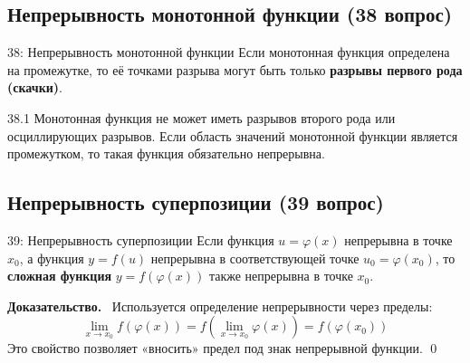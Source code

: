 \documentclass[a4paper,12pt]{article}
\newcommand{\myproof}{\textbf{Доказательство.}\ }
\begin{document}
	\vspace{1cm}
	\subsection{Непрерывность монотонной функции (38 вопрос)}
	
	\begin{theorembox}{38: Непрерывность монотонной функции}
		Если монотонная функция определена на промежутке, то её точками разрыва могут быть только \textbf{разрывы первого рода (скачки)}.
	\end{theorembox}
	
	\begin{remarkbox}{38.1}
		Монотонная функция не может иметь разрывов второго рода или осциллирующих разрывов. Если область значений монотонной функции является промежутком, то такая функция обязательно непрерывна.
	\end{remarkbox}
	
	
	
	
	\newpage
	\subsection{Непрерывность суперпозиции (39 вопрос)}
	
	\begin{theorembox}{39: Непрерывность суперпозиции}
		Если функция $u = \varphi(x)$ непрерывна в точке $x_0$, а функция $y = f(u)$ непрерывна в соответствующей точке $u_0 = \varphi(x_0)$, то \textbf{сложная функция} $y = f(\varphi(x))$ также непрерывна в точке $x_0$.
	\end{theorembox}
	
	\myproof
	Используется определение непрерывности через пределы:
	\[ \lim_{x \to x_0} f(\varphi(x)) = f(\lim_{x \to x_0} \varphi(x)) = f(\varphi(x_0)) \]
	Это свойство позволяет «вносить» предел под знак непрерывной функции. \qed
	
	\begin{center}
	\end{center}
	
\end{document}

